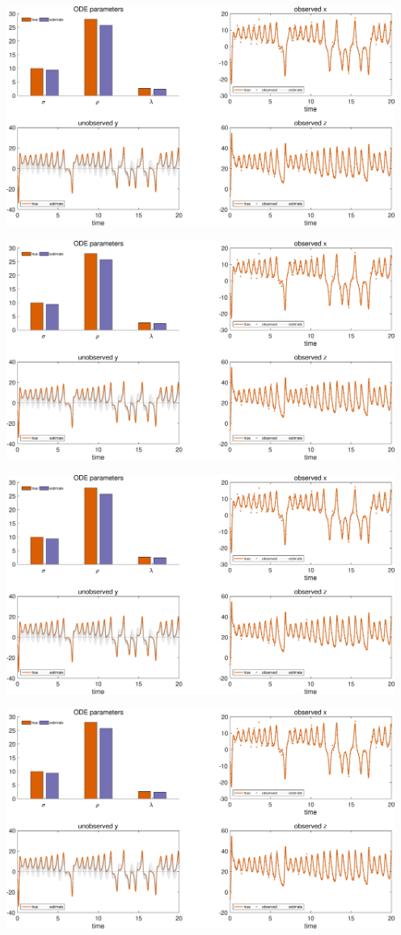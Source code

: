 {\includegraphics [width=5in]{VGM_for_Lorenz_Attractor_18.eps}

\includegraphics [width=5in]{VGM_for_Lorenz_Attractor_19.eps}

\includegraphics [width=5in]{VGM_for_Lorenz_Attractor_20.eps}

\includegraphics [width=5in]{VGM_for_Lorenz_Attractor_21.eps}

}
